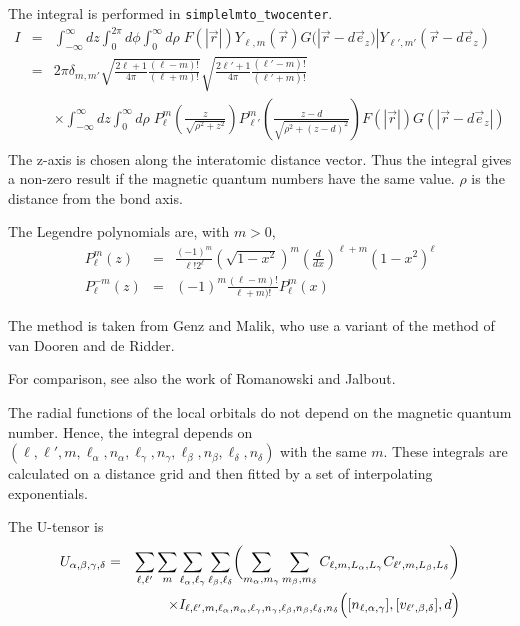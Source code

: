\documentclass[11pt,a4paper]{report}
\begin{document}
The integral is performed in \verb|simplelmto_twocenter|.
\begin{eqnarray}
I&=&\int_{-\infty}^\infty dz \int_0^{2\pi}d\phi \int_0^\infty d\rho\;
F(|\vec{r}|)Y_{\ell,m}(\vec{r})G(|\vec{r}-d\vec{e}_z)|Y_{\ell',m'}(\vec{r}-d\vec{e}_z) 
\nonumber\\
&=& 2\pi\delta_{m,m'}
\sqrt{\frac{2\ell+1}{4\pi}\frac{(\ell-m)!}{(\ell+m)!}}
\sqrt{\frac{2\ell'+1}{4\pi}\frac{(\ell'-m)!}{(\ell'+m)!}}
\nonumber\\
&&\times\int_{-\infty}^{\infty}dz \int_{0}^{\infty} d\rho\;
P^{m}_{\ell}\left(\frac{z}{\sqrt{\rho^2+z^2}}\right)
P^{m}_{\ell'}\left(\frac{z-d}{\sqrt{\rho^2+(z-d)^2}}\right)
F(|\vec{r}|)G(|\vec{r}-d\vec{e}_z|)
\nonumber\\
\label{eq:twocenterintegral}
\end{eqnarray}
The z-axis is chosen along the interatomic distance vector.  Thus the
integral gives a non-zero result if the magnetic quantum numbers have
the same value. $\rho$ is the distance from the bond axis.

The Legendre polynomials are, with $m>0$,
\begin{eqnarray}
P^{m}_{\ell}(z)&=&\frac{(-1)^m}{\ell!2^\ell} (\sqrt{1-x^2})^m\left(\frac{d}{dx}\right)^{\ell+m}(1-x^2)^\ell
\nonumber\\
P^{-m}_{\ell}(z)&=&(-1)^m\frac{(\ell-m)!}{\ell+m)!} P^{m}_{\ell}(x)
\end{eqnarray}



The method is taken from Genz and
Malik\cite{genz80_jcomputapplmath6_295}, who use a variant of the
method of van Dooren and de
Ridder\cite{vandooren76_jcomputapplmath2_207}.

For comparison, see also the work of Romanowski and Jalbout.
\cite{romanowski08_ijqc108_249,romanowski08_ijqc108_487,
  romanowski08_ijqc108_1465 ,romanowski09_jmathchem46_97}



The radial functions of the local orbitals do not depend on the
magnetic quantum number. Hence, the integral depends on
$(\ell,\ell',m,\ell_\alpha,n_\alpha,\ell_\gamma,n_\gamma,\ell_\beta,n_\beta,\ell_\delta,n_\delta)$
with the same $m$.  These integrals are calculated on a distance grid
and then fitted by a set of interpolating exponentials.

The U-tensor is
\begin{eqnarray}
U_{\alpha,\beta,\gamma,\delta}
&=&\sum_{\ell,\ell'}\sum_m\sum_{\ell_\alpha,\ell_\gamma}\sum_{\ell_\beta,\ell_\delta}
\biggl(\sum_{m_\alpha,m_\gamma}\sum_{m_\beta,m_\delta}
C_{\ell,m,L_\alpha,L_\gamma}C_{\ell',m,L_\beta,L_\delta}
\biggr)
\nonumber\\
&&\times I_{\ell,\ell',m,\ell_\alpha,n_\alpha,\ell_\gamma,n_\gamma,\ell_\beta,n_\beta,\ell_\delta,n_\delta}
\Bigl([n_{\ell,\alpha,\gamma}],[v_{\ell',\beta,\delta}],d\Bigr)
\end{eqnarray}
\end{document}
